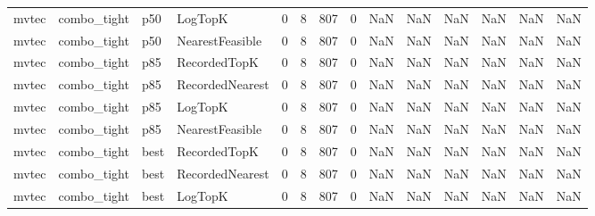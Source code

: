 \begin{tabular}{llllrrrrrrrrrr}
   mvtec &          combo\_tight &    p50 &         LogTopK &           0 &          8 &            807 &                   0 &            NaN &             NaN &                       NaN &            NaN &                    NaN &                     NaN \\
   mvtec &          combo\_tight &    p50 & NearestFeasible &           0 &          8 &            807 &                   0 &            NaN &             NaN &                       NaN &            NaN &                    NaN &                     NaN \\
   mvtec &          combo\_tight &    p85 &    RecordedTopK &           0 &          8 &            807 &                   0 &            NaN &             NaN &                       NaN &            NaN &                    NaN &                     NaN \\
   mvtec &          combo\_tight &    p85 & RecordedNearest &           0 &          8 &            807 &                   0 &            NaN &             NaN &                       NaN &            NaN &                    NaN &                     NaN \\
   mvtec &          combo\_tight &    p85 &         LogTopK &           0 &          8 &            807 &                   0 &            NaN &             NaN &                       NaN &            NaN &                    NaN &                     NaN \\
   mvtec &          combo\_tight &    p85 & NearestFeasible &           0 &          8 &            807 &                   0 &            NaN &             NaN &                       NaN &            NaN &                    NaN &                     NaN \\
   mvtec &          combo\_tight &   best &    RecordedTopK &           0 &          8 &            807 &                   0 &            NaN &             NaN &                       NaN &            NaN &                    NaN &                     NaN \\
   mvtec &          combo\_tight &   best & RecordedNearest &           0 &          8 &            807 &                   0 &            NaN &             NaN &                       NaN &            NaN &                    NaN &                     NaN \\
   mvtec &          combo\_tight &   best &         LogTopK &           0 &          8 &            807 &                   0 &            NaN &             NaN &                       NaN &            NaN &                    NaN &                     NaN \\

\end{tabular}
